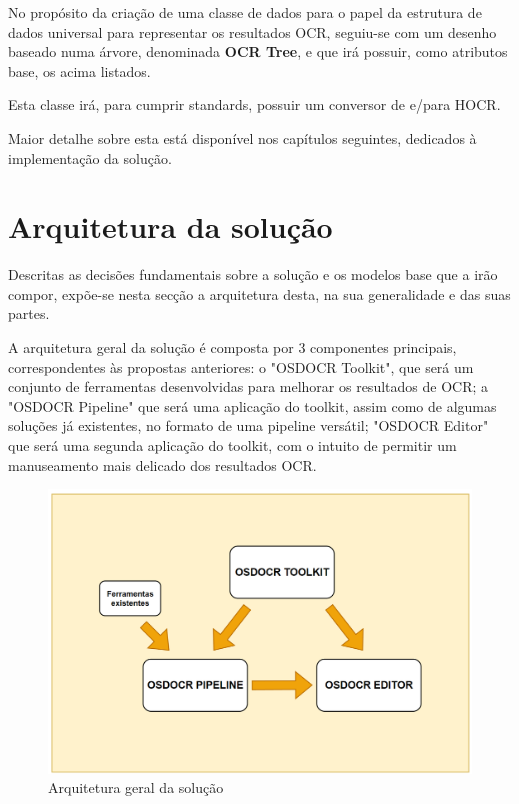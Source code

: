 No propósito da criação de uma classe de dados para o papel da estrutura de dados universal para representar os resultados OCR, seguiu-se com um desenho baseado numa árvore, denominada \textbf{OCR Tree}, e que irá possuir, como atributos base, os acima listados.

Esta classe irá, para cumprir standards, possuir um conversor de e/para HOCR. 

Maior detalhe sobre esta está disponível nos capítulos seguintes, dedicados à implementação da solução.


\section{Arquitetura da solução}

Descritas as decisões fundamentais sobre a solução e os modelos base que a irão compor, expõe-se nesta secção a arquitetura desta, na sua generalidade e das suas partes.

A arquitetura geral da solução é composta por 3 componentes principais, correspondentes às propostas anteriores: o "OSDOCR Toolkit", que será um conjunto de ferramentas desenvolvidas para melhorar os resultados de OCR; a "OSDOCR Pipeline" que será uma aplicação do toolkit, assim como de algumas soluções já existentes, no formato de uma pipeline versátil; "OSDOCR Editor" que será uma segunda aplicação do toolkit, com o intuito de permitir um manuseamento mais delicado dos resultados OCR.

\begin{figure}[H]
	\centering
	\includegraphics[width=1\textwidth]{images/diagramas/arquitetura_geral.png}
	\caption{Arquitetura geral da solução}
	\label{fig:arquitetura_geral}
\end{figure}

